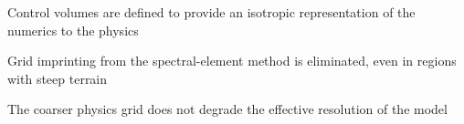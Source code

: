 \documentclass{agujournal}
\begin{document}





\begin{keypoints}
\item Control volumes are defined to provide an isotropic representation of the numerics to the physics
\item Grid imprinting from the spectral-element method is eliminated, even in regions with steep terrain
\item The coarser physics grid does not degrade the effective resolution of the model
\end{keypoints}

%
%

\end{document}
